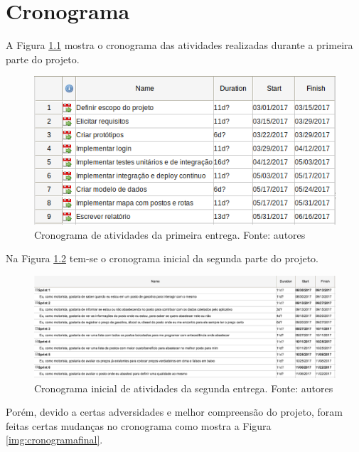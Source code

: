 \chapter[Cronograma]{Cronograma}
\label{chap:crono}

A Figura \ref{img:cronograma} mostra o cronograma das atividades realizadas durante a primeira parte do projeto.

\begin{figure}[H]
    \centering
    \includegraphics[scale=0.5]{figuras/cronograma_r1.png}
    \caption[Cronograma de atividades da primeira entrega.]{Cronograma de atividades da primeira entrega. Fonte: autores}
    \label{img:cronograma}
\end{figure}

Na Figura \ref{img:cronograma2inicial} tem-se o cronograma inicial da segunda parte do projeto.

\begin{figure}[H]
    \centering
    \includegraphics[scale=0.4]{figuras/cronograma_segunda_parte_1.png}
    \caption[Cronograma inicial de atividades da segunda entrega.]{Cronograma inicial de atividades da segunda entrega. Fonte: autores}
    \label{img:cronograma2inicial}
\end{figure}
\pagebreak

Porém, devido a certas adversidades e melhor compreensão do projeto, foram feitas certas mudanças no cronograma como mostra a Figura \ref{img:cronogramafinal}.

